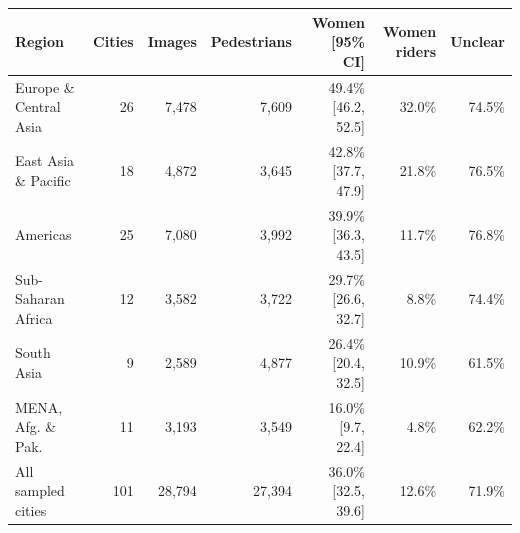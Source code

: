 \begin{tabular}{@{}lrrrrrr@{}}
\toprule
Region & Cities & Images & Pedestrians & Women [95\% CI] & Women riders & Unclear \\
\midrule
Europe \& Central Asia & 26 & 7,478 & 7,609 & 49.4\% [46.2, 52.5] & 32.0\% & 74.5\% \\
East Asia \& Pacific & 18 & 4,872 & 3,645 & 42.8\% [37.7, 47.9] & 21.8\% & 76.5\% \\
Americas & 25 & 7,080 & 3,992 & 39.9\% [36.3, 43.5] & 11.7\% & 76.8\% \\
Sub-Saharan Africa & 12 & 3,582 & 3,722 & 29.7\% [26.6, 32.7] & 8.8\% & 74.4\% \\
South Asia & 9 & 2,589 & 4,877 & 26.4\% [20.4, 32.5] & 10.9\% & 61.5\% \\
MENA, Afg. \& Pak. & 11 & 3,193 & 3,549 & 16.0\% [9.7, 22.4] & 4.8\% & 62.2\% \\
All sampled cities & 101 & 28,794 & 27,394 & 36.0\% [32.5, 39.6] & 12.6\% & 71.9\% \\
\bottomrule
\end{tabular}
